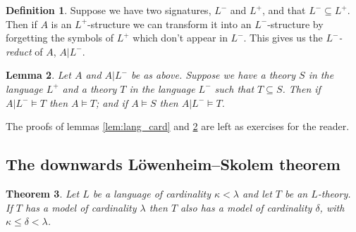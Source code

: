 \documentclass[10pt, a4paper, oneside]{article}
\newtheorem{thm}{Theorem}[section]
\theoremstyle{definition}
\newtheorem{dfn}[thm]{Definition}
\theoremstyle{remark}
\theoremstyle{plain}
\newtheorem{lem}[thm]{Lemma}
\theoremstyle{plain}
\begin{document}
\begin{dfn}
    Suppose we have two signatures, $L^-$ and $L^+$, and that $L^- \subseteq
    L^+$. Then if $A$ is an $L^+$-structure we can transform it into an
    $L^-$-structure by forgetting the symbols of $L^+$ which don't appear in
    $L^-$. This gives us the \emph{$L^-$-reduct} of $A$, $A|L^-$.
\end{dfn}

\begin{lem}
    \label{lem:reducts}
    Let $A$ and $A| L^-$ be as above. Suppose we have a theory $S$ in the
    language $L^+$ and a theory $T$ in the language $L^-$ such that
    $T \subseteq S$. Then if $A|L^- \models T$ then $A \models T$; and if
    $A \models S$ then $A| L^- \models T$.
\end{lem}

The proofs of lemmas \ref{lem:lang_card} and \ref{lem:reducts} are left as
exercises for the reader.

\subsection{The downwards Löwenheim--Skolem theorem}

\begin{thm}
    Let $L$ be a language of cardinality $\kappa < \lambda$ and let $T$ be an
    $L$-theory. If $T$ has a model of cardinality $\lambda$ then $T$ also has a
    model of cardinality $\delta$, with $\kappa \leq \delta < \lambda$.
\end{thm}
\end{document}
